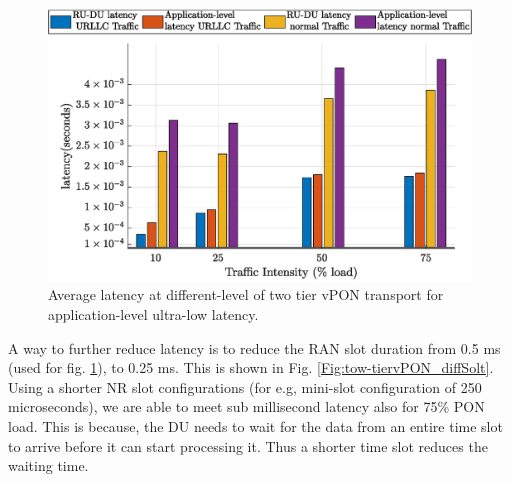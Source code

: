 \documentclass[a4paper, oneside, twocolumn, notitlepage, 10pt]{extarticle_ecoc}
\begin{document}
\begin{figure}[h]
	\centering
	\includegraphics[clip, trim={0 0 0 0}, width=\linewidth]{./Figures/tow-tiervPON.eps}
	\caption{Average latency at different-level of two tier vPON transport for application-level ultra-low latency.}
	\label{Fig:tow-tiervPON}
\end{figure}
A way to further reduce latency is to reduce the RAN slot duration from 0.5 ms (used for fig. \ref{Fig:tow-tiervPON}), to 0.25 ms. This is shown in Fig. \ref{Fig:tow-tiervPON_diffSolt}. %
Using a shorter NR slot configurations (for e.g, mini-slot configuration of 250 microseconds), we are able to meet sub millisecond latency also for 75\% PON load. This is because, the DU needs to wait for the data from an entire time slot to arrive before it can start processing it. Thus a shorter time slot reduces the waiting time. %
\end{document}
